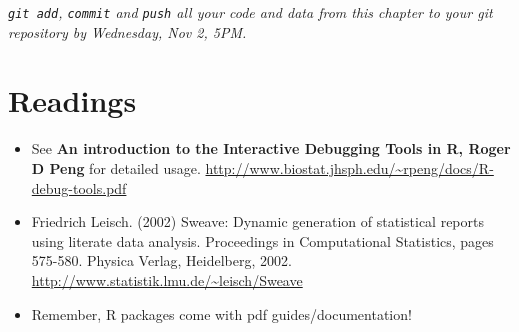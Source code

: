 \begin{center}
	\it {\tt git add}, {\tt commit} and {\tt push} all your code and data 
	from this chapter to your git repository by Wednesday, Nov 2, 5PM.
\end{center}

\section{Readings}

\begin{itemize}
    
	\item See {\bf An introduction to the Interactive Debugging Tools in R,
	Roger D Peng} for detailed usage. 
	\url{http://www.biostat.jhsph.edu/~rpeng/docs/R-debug-tools.pdf}
	
	\item Friedrich Leisch. (2002) Sweave: Dynamic generation of statistical 
	reports using literate data analysis. Proceedings in Computational 
	Statistics, pages 575-580. Physica Verlag, Heidelberg, 2002. 
	\url{http://www.statistik.lmu.de/~leisch/Sweave}
	
	\item Remember, R packages come with pdf guides/documentation!
	
\end{itemize}

